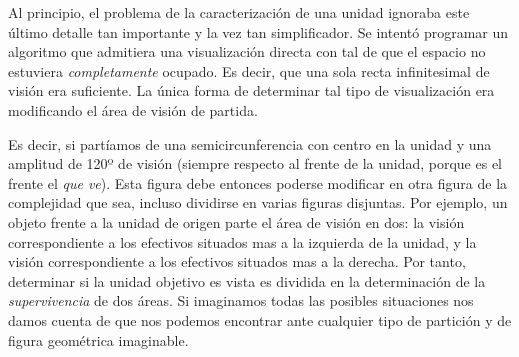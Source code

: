 Al principio, el problema de la caracterización de una unidad ignoraba
este último detalle tan importante y la vez tan simplificador. Se
intentó programar un algoritmo que admitiera una visualización directa
con tal de que el espacio no estuviera \emph{completamente}
ocupado. Es decir, que una sola recta infinitesimal de visión era
suficiente. La única forma de determinar tal tipo de visualización era
modificando el área de visión de partida.

Es decir, si partíamos de una semicircunferencia con centro en la
unidad y una amplitud de 120º de visión (siempre respecto al frente de
la unidad, porque es el frente el \emph{que ve}). Esta figura debe
entonces poderse modificar en otra figura de la complejidad que sea,
incluso dividirse en varias figuras disjuntas. Por ejemplo, un objeto
frente a la unidad de origen parte el área de visión en dos: la visión
correspondiente a los efectivos situados mas a la izquierda de la
unidad, y la visión correspondiente a los efectivos situados mas a la
derecha. Por tanto, determinar si la unidad objetivo es vista es
dividida en la determinación de la \emph{supervivencia} de dos
áreas. Si imaginamos todas las posibles situaciones nos damos cuenta
de que nos podemos encontrar ante cualquier tipo de partición y de
figura geométrica imaginable.

